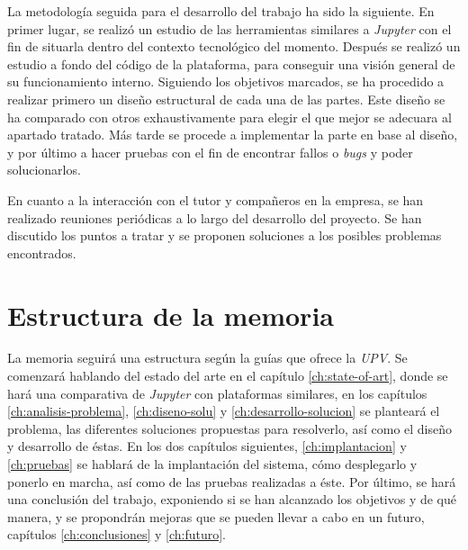 \documentclass[11pt,spanish,listoffigures]{tfgetsinf}
\begin{document}
La metodología seguida para el desarrollo del trabajo ha sido la siguiente. En primer lugar, se realizó un estudio de las herramientas similares a \textit{Jupyter} con el fin de situarla dentro del contexto tecnológico del momento. Después se realizó un estudio a fondo del código de la plataforma, para conseguir una visión general de su funcionamiento interno. Siguiendo los objetivos marcados, se ha procedido a realizar primero un diseño estructural de cada una de las partes. Este diseño se ha comparado con otros exhaustivamente para elegir el que mejor se adecuara al apartado tratado. Más tarde se procede a implementar la parte en base al diseño, y por último a hacer pruebas con el fin de encontrar fallos o \textit{\gls{bug}s} y poder solucionarlos.

En cuanto a la interacción con el tutor y compañeros en la empresa, se han realizado reuniones periódicas a lo largo del desarrollo del proyecto. Se han discutido los puntos a tratar y se proponen soluciones a los posibles problemas encontrados.



\section{Estructura de la memoria}
\label{sec:estructura}

La memoria seguirá una estructura según la guías que ofrece la \textit{UPV}. Se comenzará hablando del estado del arte en el capítulo \ref{ch:state-of-art}, donde se hará una comparativa de \textit{Jupyter} con plataformas similares, en los capítulos \ref{ch:analisis-problema}, \ref{ch:diseno-solu} y \ref{ch:desarrollo-solucion} se planteará el problema, las diferentes soluciones propuestas para resolverlo, así como el diseño y desarrollo de éstas. En los dos capítulos siguientes, \ref{ch:implantacion} y \ref{ch:pruebas} se hablará de la implantación del sistema, cómo desplegarlo y ponerlo en marcha, así como de las pruebas realizadas a éste. Por último, se hará una conclusión del trabajo, exponiendo si se han alcanzado los objetivos y de qué manera, y se propondrán mejoras que se pueden llevar a cabo en un futuro, capítulos \ref{ch:conclusiones} y \ref{ch:futuro}. 


\end{document}
